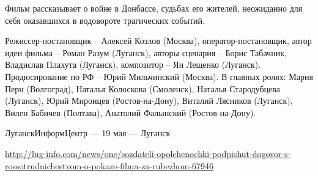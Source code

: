 Фильм рассказывает о войне в Донбассе, судьбах его жителей, неожиданно для себя
оказавшихся в водовороте трагических событий.

Режиссер-постановщик – Алексей Козлов (Москва), оператор-постановщик, автор
идеи фильма – Роман Разум (Луганск), авторы сценария – Борис Табачник,
Владислав Плахута (Луганск), композитор – Ян Лещенко (Луганск). Продюсирование
по РФ – Юрий Мильчинский (Москва). В главных ролях: Мария Перн (Волгоград),
Наталья Колоскова (Смоленск), Наталья Стародубцева (Луганск), Юрий Миронцев
(Ростов-на-Дону), Виталий Лясников (Луганск), Вилен Бабичев (Полтава), Анатолий
Фалынский (Ростов-на-Дону). 

ЛуганскИнформЦентр — 19 мая — Луганск

\url{http://lug-info.com/news/one/sozdateli-opolchenochki-podpishut-dogovor-s-rossotrudnichestvom-o-pokaze-filma-za-rubezhom-67946}
